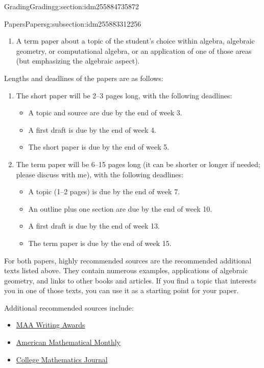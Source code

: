 \documentclass[oneside,10pt,]{article}
\begin{document}
\begin{sectionptx}{Grading}{}{Grading}{}{}{g:section:idm255884735872}
\begin{subsectionptx}{Papers}{}{Papers}{}{}{g:subsection:idm255883312256}
\begin{enumerate}
\item{}A term paper about a topic of the student's choice within algebra, algebraic geometry, or computational algebra, or an application of one of those areas (but emphasizing the algebraic aspect).%
\end{enumerate}
%
\par
Lengths and deadlines of the papers are as follows:%
\begin{enumerate}
\item{}The short paper will be 2–3 pages long, with the following deadlines:%
\begin{itemize}[label=\textbullet]
\item{}A topic and source are due by the end of week 3.%
\item{}A first draft is due by the end of week 4.%
\item{}The short paper is due by the end of week 5.%
\end{itemize}
%
\item{}The term paper will be 6–15 pages long (it can be shorter or longer if needed; please discuss with me), with the following deadlines:%
\begin{itemize}[label=\textbullet]
\item{}A topic (1–2 pages) is due by the end of week 7.%
\item{}An outline plus one section are due by the end of week 10.%
\item{}A first draft is due by the end of week 13.%
\item{}The term paper is due by the end of week 15.%
\end{itemize}
%
\end{enumerate}
%
\par
For both papers, highly recommended sources are the recommended additional texts listed above. They contain numerous examples, applications of algebraic geometry, and links to other books and articles. If you find a topic that interests you in one of those texts, you can use it as a starting point for your paper.%
\par
Additional recommended sources include:%
\begin{itemize}[label=\textbullet]
\item{}\href{https://www.maa.org/programs-and-communities/member-communities/maa-awards/writing-awards}{MAA Writing Awards}%
\item{}\href{https://www-jstor-org.libproxy.boisestate.edu/journal/amermathmont}{American Mathematical Monthly}%
\item{}\href{https://www-jstor-org.libproxy.boisestate.edu/journal/collmathj}{College Mathematics Journal}%

\end{itemize}
\end{subsectionptx}
\end{sectionptx}
\end{document}
